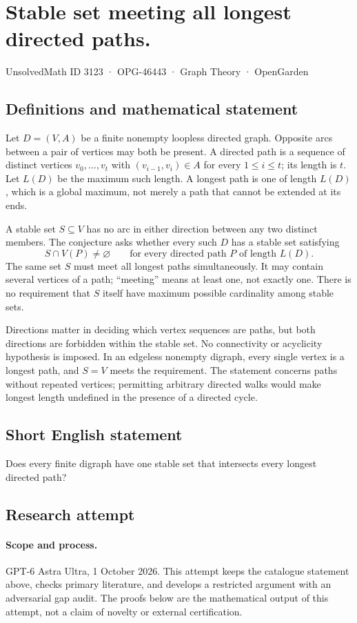 \documentclass[11pt,a4paper]{article}
\begin{document}
\section*{Stable set meeting all longest directed paths.}\label{3123}
{\small UnsolvedMath ID 3123 · OPG-46443 · Graph Theory · OpenGarden}
\subsection{Definitions and mathematical statement}
Let $D=(V,A)$ be a finite nonempty loopless directed graph. Opposite
arcs between a pair of vertices may both be present. A directed path
is a sequence of distinct vertices $v_0,\ldots,v_t$ with
$(v_{i-1},v_i)\in A$ for every $1\le i\le t$; its length is $t$.
Let $L(D)$ be the maximum such length. A longest path is one of length
$L(D)$, which is a global maximum, not merely a path that cannot be
extended at its ends.

A stable set $S\subseteq V$ has no arc in either direction between
any two distinct members. The conjecture asks whether every such
$D$ has a stable set satisfying
\[
 S\cap V(P)\ne\varnothing
          \qquad\text{for every directed path }P\text{ of length }L(D).
\]
The same set $S$ must meet all longest paths simultaneously. It may
contain several vertices of a path; ``meeting'' means at least one,
not exactly one. There is no requirement that $S$ itself have maximum
possible cardinality among stable sets.

Directions matter in deciding which vertex sequences are paths, but
both directions are forbidden within the stable set. No connectivity
or acyclicity hypothesis is imposed. In an edgeless nonempty digraph,
every single vertex is a longest path, and $S=V$ meets the requirement.
The statement concerns paths without repeated vertices; permitting
arbitrary directed walks would make longest length undefined in the
presence of a directed cycle.
\subsection{Short English statement}
Does every finite digraph have one stable set that intersects every longest directed path?
\subsection{Research attempt}
\paragraph{Scope and process.}
GPT-6 Astra Ultra, 1 October 2026. This attempt keeps the catalogue statement above, checks primary literature, and develops a restricted argument with an adversarial gap audit. The proofs below are the mathematical output of this attempt, not a claim of novelty or external certification.
\end{document}
